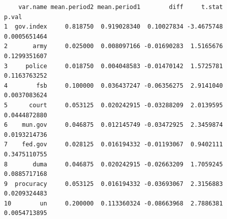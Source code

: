 \documentclass[
  letterpaper,
  DIV=11,
  numbers=noendperiod]{scrartcl}
\begin{document}
\begin{verbatim}
    var.name mean.period2 mean.period1        diff     t.stat        p.val
1  gov.index     0.818750  0.919028340  0.10027834 -3.4675748 0.0005651464
2       army     0.025000  0.008097166 -0.01690283  1.5165676 0.1299351607
3     police     0.018750  0.004048583 -0.01470142  1.5725781 0.1163763252
4        fsb     0.100000  0.036437247 -0.06356275  2.9141040 0.0037083624
5      court     0.053125  0.020242915 -0.03288209  2.0139595 0.0444872880
6    mun.gov     0.046875  0.012145749 -0.03472925  2.3459874 0.0193214736
7    fed.gov     0.028125  0.016194332 -0.01193067  0.9402111 0.3475110755
8       duma     0.046875  0.020242915 -0.02663209  1.7059245 0.0885717168
9  procuracy     0.053125  0.016194332 -0.03693067  2.3156883 0.0209324483
10        un     0.200000  0.113360324 -0.08663968  2.7886381 0.0054713895
\end{verbatim}
\end{document}
